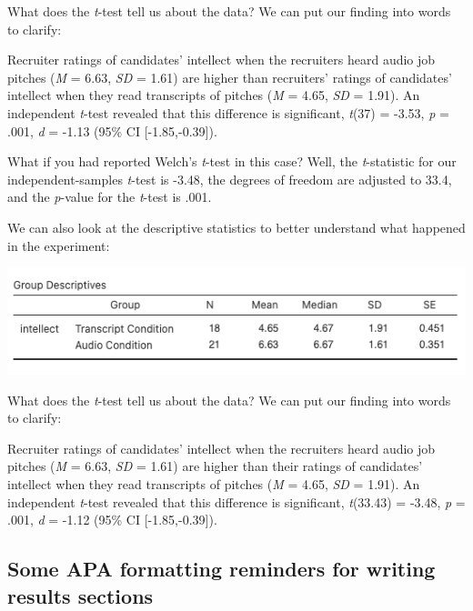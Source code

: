 \documentclass[
]{book}
\begin{document}
What does the \emph{t}-test tell us about the data? We can put our finding into words to clarify:

Recruiter ratings of candidates' intellect when the recruiters heard audio job pitches (\emph{M} = 6.63, \emph{SD} = 1.61) are higher than recruiters' ratings of candidates' intellect when they read transcripts of pitches (\emph{M} = 4.65, \emph{SD} = 1.91). An independent \emph{t}-test revealed that this difference is significant, \emph{t}(37) = -3.53, \emph{p} = .001, \emph{d} = -1.13 (95\% CI {[}-1.85,-0.39{]}).

What if you had reported Welch's \emph{t}-test in this case? Well, the \emph{t}-statistic for our independent-samples \emph{t}-test is -3.48, the degrees of freedom are adjusted to 33.4, and the \emph{p}-value for the \emph{t}-test is .001.

We can also look at the descriptive statistics to better understand what happened in the experiment:

\includegraphics{img/indttestdesc.png}

What does the \emph{t}-test tell us about the data? We can put our finding into words to clarify:

Recruiter ratings of candidates' intellect when the recruiters heard audio job pitches (\emph{M} = 6.63, \emph{SD} = 1.61) are higher than their ratings of candidates' intellect when they read transcripts of pitches (\emph{M} = 4.65, \emph{SD} = 1.91). An independent \emph{t}-test revealed that this difference is significant, \emph{t}(33.43) = -3.48, \emph{p} = .001, \emph{d} = -1.12 (95\% CI {[}-1.85,-0.39{]}).

\hypertarget{some-apa-formatting-reminders-for-writing-results-sections}{%
\subsection{Some APA formatting reminders for writing results sections}\label{some-apa-formatting-reminders-for-writing-results-sections}}
\end{document}
